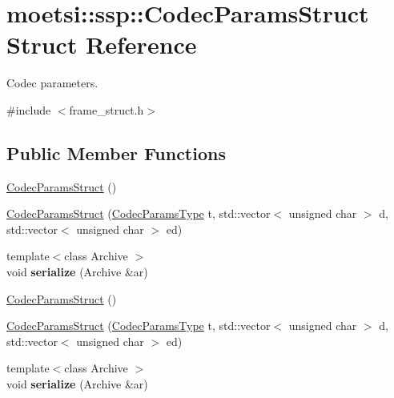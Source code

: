 \hypertarget{structmoetsi_1_1ssp_1_1CodecParamsStruct}{}\section{moetsi\+:\+:ssp\+:\+:Codec\+Params\+Struct Struct Reference}
\label{structmoetsi_1_1ssp_1_1CodecParamsStruct}


Codec parameters.  




{\ttfamily \#include $<$frame\+\_\+struct.\+h$>$}

\subsection*{Public Member Functions}
\begin{DoxyCompactItemize}
\item 
\hyperlink{structmoetsi_1_1ssp_1_1CodecParamsStruct_ae2d0f15ae18885a73ac37cf51c78abf4}{Codec\+Params\+Struct} ()
\item 
\hyperlink{structmoetsi_1_1ssp_1_1CodecParamsStruct_a51ed920bba6aef88b4d70bcf9b2647de}{Codec\+Params\+Struct} (\hyperlink{namespacemoetsi_1_1ssp_a6d638ba0bd38e9daded08f633d893563}{Codec\+Params\+Type} t, std\+::vector$<$ unsigned char $>$ d, std\+::vector$<$ unsigned char $>$ ed)
\item 
\mbox{\label{structmoetsi_1_1ssp_1_1CodecParamsStruct_a5cc4146e3f530a895ca13f37165b140a}} 
{\footnotesize template$<$class Archive $>$ }\\void {\bfseries serialize} (Archive \&ar)
\item 
\hyperlink{structmoetsi_1_1ssp_1_1CodecParamsStruct_ae2d0f15ae18885a73ac37cf51c78abf4}{Codec\+Params\+Struct} ()
\item 
\hyperlink{structmoetsi_1_1ssp_1_1CodecParamsStruct_a51ed920bba6aef88b4d70bcf9b2647de}{Codec\+Params\+Struct} (\hyperlink{namespacemoetsi_1_1ssp_a6d638ba0bd38e9daded08f633d893563}{Codec\+Params\+Type} t, std\+::vector$<$ unsigned char $>$ d, std\+::vector$<$ unsigned char $>$ ed)
\item 
\mbox{\label{structmoetsi_1_1ssp_1_1CodecParamsStruct_a5cc4146e3f530a895ca13f37165b140a}} 
{\footnotesize template$<$class Archive $>$ }\\void {\bfseries serialize} (Archive \&ar)
\end{DoxyCompactItemize}

